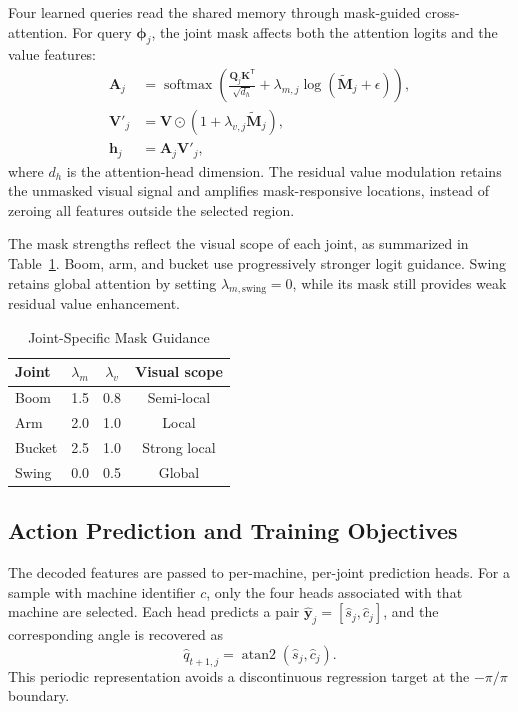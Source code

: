 \documentclass[journal]{IEEEtran}
\begin{document}
Four learned queries read the shared memory through mask-guided cross-attention.
For query $\boldsymbol{\phi}_{j}$, the joint mask affects both the attention
logits and the value features:
\begin{align}
\mathbf{A}_{j} &= \operatorname{softmax}\!\left(
\frac{\mathbf{Q}_{j}\mathbf{K}^{\mathsf{T}}}{\sqrt{d_h}}+
\lambda_{m,j}\log\!\left(\widetilde{\mathbf{M}}_{j}+\epsilon\right)
\right), \\
\mathbf{V}'_{j} &= \mathbf{V}\odot
\left(1+\lambda_{v,j}\widetilde{\mathbf{M}}_{j}\right), \\
\mathbf{h}_{j} &= \mathbf{A}_{j}\mathbf{V}'_{j},
\label{eq:mask_attention}
\end{align}
where $d_h$ is the attention-head dimension. The residual value modulation
retains the unmasked visual signal and amplifies mask-responsive locations,
instead of zeroing all features outside the selected region.

The mask strengths reflect the visual scope of each joint, as summarized in
Table~\ref{tab:mask_strength}. Boom, arm, and bucket use progressively stronger
logit guidance. Swing retains global attention by setting
$\lambda_{m,\mathrm{swing}}=0$, while its mask still provides weak residual
value enhancement.

\begin{table}[!t]
\caption{Joint-Specific Mask Guidance}
\label{tab:mask_strength}
\centering
\begin{tabular}{lccc}
\toprule
Joint & $\lambda_m$ & $\lambda_v$ & Visual scope \\
\midrule
Boom   & 1.5 & 0.8 & Semi-local \\
Arm    & 2.0 & 1.0 & Local \\
Bucket & 2.5 & 1.0 & Strong local \\
Swing  & 0.0 & 0.5 & Global \\
\bottomrule
\end{tabular}
\end{table}

\subsection{Action Prediction and Training Objectives}
\label{subsec:objectives}

The decoded features are passed to per-machine, per-joint prediction heads.
For a sample with machine identifier $c$, only the four heads associated with
that machine are selected. Each head predicts a pair
$\widehat{\mathbf{y}}_{j}=[\hat{s}_{j},\hat{c}_{j}]$, and the corresponding
angle is recovered as
\begin{equation}
\hat{q}_{t+1,j}=\operatorname{atan2}(\hat{s}_{j},\hat{c}_{j}).
\label{eq:angle_decode}
\end{equation}
This periodic representation avoids a discontinuous regression target at the
$-\pi/\pi$ boundary.
\end{document}
